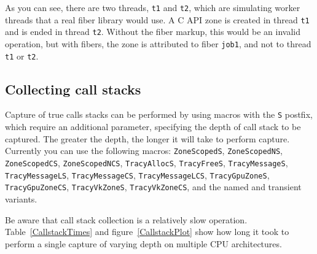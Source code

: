 \documentclass[hidelinks,titlepage,a4paper,twoside]{article}
\begin{document}
As you can see, there are two threads, \texttt{t1} and \texttt{t2}, which are simulating worker threads that a real fiber library would use. A C API zone is created in thread \texttt{t1} and is ended in thread \texttt{t2}. Without the fiber markup, this would be an invalid operation, but with fibers, the zone is attributed to fiber \texttt{job1}, and not to thread \texttt{t1} or \texttt{t2}.

\subsection{Collecting call stacks}
\label{collectingcallstacks}

Capture of true calls stacks can be performed by using macros with the \texttt{S} postfix, which require an additional parameter, specifying the depth of call stack to be captured. The greater the depth, the longer it will take to perform capture. Currently you can use the following macros: \texttt{ZoneScopedS}, \texttt{ZoneScopedNS}, \texttt{ZoneScopedCS}, \texttt{ZoneScopedNCS}, \texttt{TracyAllocS}, \texttt{TracyFreeS}, \texttt{TracyMessageS}, \texttt{TracyMessageLS}, \texttt{TracyMessageCS}, \texttt{TracyMessageLCS}, \texttt{TracyGpuZoneS}, \texttt{TracyGpuZoneCS}, \texttt{TracyVkZoneS}, \texttt{TracyVkZoneCS}, and the named and transient variants.

Be aware that call stack collection is a relatively slow operation. Table~\ref{CallstackTimes} and figure~\ref{CallstackPlot} show how long it took to perform a single capture of varying depth on multiple CPU architectures.
\end{document}
